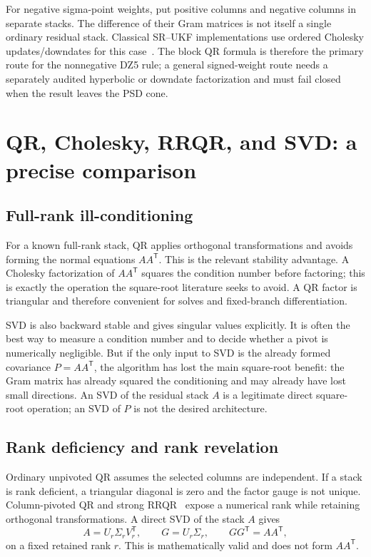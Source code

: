 \documentclass[11pt]{article}
\newcommand{\transpose}{^{\mathsf T}}
\begin{document}
For negative sigma-point weights, put positive columns and negative columns in
separate stacks.  The difference of their Gram matrices is not itself a single
ordinary residual stack.  Classical SR--UKF implementations use ordered
Cholesky updates/downdates for this case~\cite{vandermerwewan2001}.  The block
QR formula is therefore the primary route for the nonnegative DZ5 rule; a
general signed-weight route needs a separately audited hyperbolic or downdate
factorization and must fail closed when the result leaves the PSD cone.

\section{QR, Cholesky, RRQR, and SVD: a precise comparison}

\subsection{Full-rank ill-conditioning}

For a known full-rank stack, QR applies orthogonal transformations and avoids
forming the normal equations $A A\transpose$.  This is the relevant stability
advantage.  A Cholesky factorization of $A A\transpose$ squares the condition
number before factoring; this is exactly the operation the square-root
literature seeks to avoid.  A QR factor is triangular and therefore convenient
for solves and fixed-branch differentiation.

SVD is also backward stable and gives singular values explicitly.  It is often
the best way to measure a condition number and to decide whether a pivot is
numerically negligible.  But if the only input to SVD is the already formed
covariance $P=A A\transpose$, the algorithm has lost the main square-root
benefit: the Gram matrix has already squared the conditioning and may already
have lost small directions.  An SVD of the residual stack $A$ is a legitimate
direct square-root operation; an SVD of $P$ is not the desired architecture.

\subsection{Rank deficiency and rank revelation}

Ordinary unpivoted QR assumes the selected columns are independent.  If a
stack is rank deficient, a triangular diagonal is zero and the factor gauge is
not unique.  Column-pivoted QR and strong RRQR~\cite{chan1987,gu1996} expose a
numerical rank while retaining orthogonal transformations.  A direct SVD of the
stack $A$ gives
\begin{equation}
 A=U_r\Sigma_rV_r\transpose,
 \qquad G=U_r\Sigma_r,
 \qquad GG\transpose=A A\transpose,
 \label{eq:svd-stack}
\end{equation}
on a fixed retained rank $r$.  This is mathematically valid and does not form
$A A\transpose$.
\end{document}
